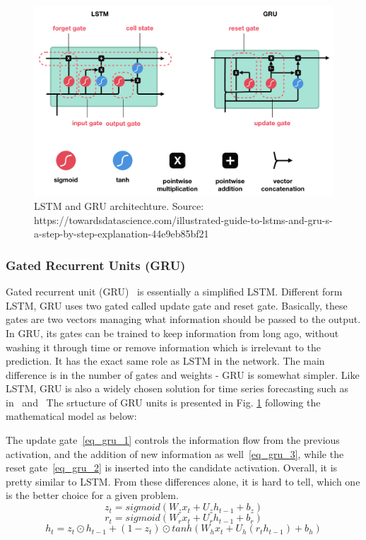 \documentclass[a4paper,13pt,2p]{report}
\begin{document}
\begin{figure}[!ht] 
   \centering
   \includegraphics[width=1.0\linewidth]{png/lstm_gru}
  \caption{LSTM and GRU architechture. Source: https://towardsdatascience.com/illustrated-guide-to-lstms-and-gru-s-a-step-by-step-explanation-44e9eb85bf21} 
  \label{model_lstm_gru} 
\end{figure}

\subsubsection{Gated Recurrent Units (GRU)}

	Gated recurrent unit (GRU)~\cite{chung2014empirical} is essentially a simplified LSTM. Different form LSTM, GRU uses two gated called update gate and reset gate. Basically, these gates are two vectors managing what information should be passed to the output. In GRU, its gates can be trained to keep information from long ago, without washing it through time or remove information which is irrelevant to the prediction. It has the exact same role as LSTM in the network. The main difference is in the number of gates and weights - GRU is somewhat simpler. Like LSTM, GRU is also a widely chosen solution for time series forecasting such as in~\cite{langkvist2014review} and~\cite{bone2000recurrent} The srtucture of GRU units is presented in Fig. \ref{model_lstm_gru} following the mathematical model as below:
	
	The update gate~\ref{eq_gru_1} controls the information flow from the previous activation, and the addition of new information as well~\ref{eq_gru_3}, while the reset gate~\ref{eq_gru_2} is inserted into the candidate activation. Overall, it is pretty similar to LSTM. From these differences alone, it is hard to tell, which one is the better choice for a given problem. 
\begin{equation}\label{eq_gru_1}
z_t = sigmoid(W_zx_t + U_zh_{t−1} + b_z)
\end{equation}
\begin{equation}\label{eq_gru_2}
r_t = sigmoid(W_rx_t + U_rh_{t−1} + b_r)
\end{equation}
\begin{equation}\label{eq_gru_3}
h_t = z_t\odot h_{t-1} + (1 - z_t)\odot tanh(W_hx_t + U_h(r_th_{t-1}) + b_h)
\end{equation}
\end{document}

